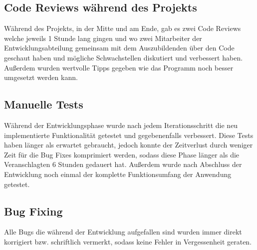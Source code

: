\subsection{Code Reviews während des Projekts}
\label{sec:Code Reviews während des Projekts}
Während des Projekts, in der Mitte und am Ende, gab es zwei Code Reviews welche jeweils 1 Stunde lang gingen und wo zwei Mitarbeiter der Entwicklungsabteilung gemeinsam mit dem Auszubildenden über den Code geschaut haben und mögliche Schwachstellen diskutiert und verbessert haben. Außerdem wurden wertvolle Tipps gegeben wie das Programm noch besser umgesetzt werden kann.    

\subsection{Manuelle Tests}
\label{sec:Manuelle Tests}
Während der Entwicklungsphase wurde nach jedem Iterationsschritt die neu implementierte Funktionalität getestet und gegebenenfalls verbessert. Diese Tests haben länger als erwartet gebraucht, jedoch konnte der Zeitverlust durch weniger Zeit für die Bug Fixes komprimiert werden, sodass diese Phase länger als die Veranschlagten 6 Stunden gedauert hat. Außerdem wurde nach Abschluss der Entwicklung noch einmal der komplette Funktionsumfang der Anwendung getestet. 

\subsection{Bug Fixing}
\label{sec:Bug Fixing}
Alle Bugs die während der Entwicklung aufgefallen sind wurden immer direkt korrigiert bzw. schriftlich vermerkt, sodass keine Fehler in Vergessenheit geraten.